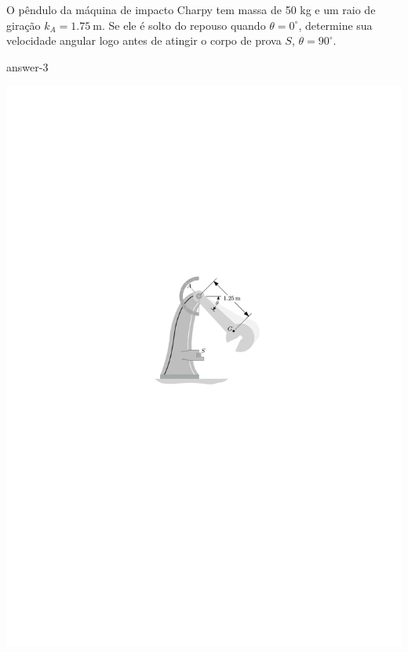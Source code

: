 \item O pêndulo da máquina de impacto Charpy tem massa de 50 kg e um raio de giração $k_{A}=\SI{1.75}{\meter}$. Se ele é
solto do repouso quando $\theta=0^{\circ}$, determine sua velocidade angular logo antes de atingir o corpo de prova
$S$, $\theta=90^{\circ}$.

{answer-3}

\vspace{-1cm}
\begin{flushright}
	\includegraphics[scale=1.3]{../../images/draw_2}
\end{flushright}